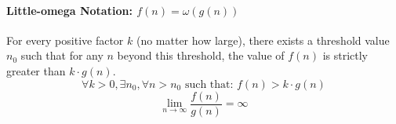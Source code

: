 \documentclass[11pt]{article}
\theoremstyle{definition}
\begin{document}
        \paragraph{Little-omega Notation: $f(n) = \omega(g(n))$}
        For every positive factor $k$ (no matter how large), there exists a threshold value $n_0$ such that for any $n$ beyond this threshold, the value of $f(n)$ is strictly greater than $k \cdot g(n)$.
        $$\forall k > 0, \exists n_0, \forall n > n_0 \text{ such that: } f(n) > k \cdot g(n)$$
        $$\lim_{n \to \infty} \frac{f(n)}{g(n)} = \infty$$
            
\end{document}
